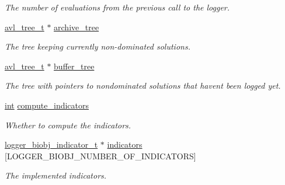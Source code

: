\begin{DoxyCompactItemize}
\begin{DoxyCompactList}\small\item\em The number of evaluations from the previous call to the logger. \end{DoxyCompactList}\item 
\hyperlink{structavl__tree}{avl\+\_\+tree\+\_\+t} $\ast$ \hyperlink{structlogger__biobj__data__t_acf84e7dffa35ed64a7ccf5a854257282}{archive\+\_\+tree}\hypertarget{structlogger__biobj__data__t_acf84e7dffa35ed64a7ccf5a854257282}{}\label{structlogger__biobj__data__t_acf84e7dffa35ed64a7ccf5a854257282}

\begin{DoxyCompactList}\small\item\em The tree keeping currently non-\/dominated solutions. \end{DoxyCompactList}\item 
\hyperlink{structavl__tree}{avl\+\_\+tree\+\_\+t} $\ast$ \hyperlink{structlogger__biobj__data__t_a51afea5bfa7e197a0b72300cd5fb1978}{buffer\+\_\+tree}\hypertarget{structlogger__biobj__data__t_a51afea5bfa7e197a0b72300cd5fb1978}{}\label{structlogger__biobj__data__t_a51afea5bfa7e197a0b72300cd5fb1978}

\begin{DoxyCompactList}\small\item\em The tree with pointers to nondominated solutions that haven\textquotesingle{}t been logged yet. \end{DoxyCompactList}\item 
\hyperlink{classint}{int} \hyperlink{structlogger__biobj__data__t_abf2bed9e4c37869b69ed1335fd3355fd}{compute\+\_\+indicators}\hypertarget{structlogger__biobj__data__t_abf2bed9e4c37869b69ed1335fd3355fd}{}\label{structlogger__biobj__data__t_abf2bed9e4c37869b69ed1335fd3355fd}

\begin{DoxyCompactList}\small\item\em Whether to compute the indicators. \end{DoxyCompactList}\item 
\hyperlink{structlogger__biobj__indicator__t}{logger\+\_\+biobj\+\_\+indicator\+\_\+t} $\ast$ \hyperlink{structlogger__biobj__data__t_a348f6a5221d7a0796607c44bb8a55731}{indicators} \mbox{[}L\+O\+G\+G\+E\+R\+\_\+\+B\+I\+O\+B\+J\+\_\+\+N\+U\+M\+B\+E\+R\+\_\+\+O\+F\+\_\+\+I\+N\+D\+I\+C\+A\+T\+O\+RS\mbox{]}\hypertarget{structlogger__biobj__data__t_a348f6a5221d7a0796607c44bb8a55731}{}\label{structlogger__biobj__data__t_a348f6a5221d7a0796607c44bb8a55731}

\begin{DoxyCompactList}\small\item\em The implemented indicators. \end{DoxyCompactList}\end{DoxyCompactItemize}


